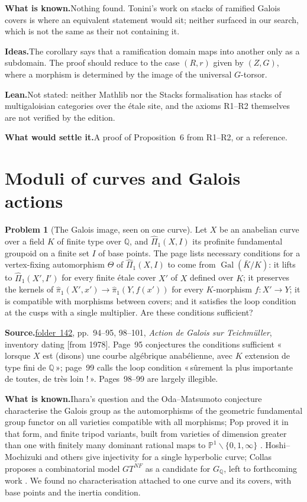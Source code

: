 \documentclass[11pt]{article}
\newcommand{\q}[1]{«\,#1\,»}
\newcommand{\fac}[1]{\href{https://grothendieck.umontpellier.fr/#1.pdf}{folder~#1}}
\newcommand{\Gal}{\operatorname{Gal}}
\theoremstyle{definition}
\newtheorem{problem}{Problem}
\theoremstyle{plain}\newtheorem*{proposition}{Proposition}\theoremstyle{definition}
\newcommand{\entry}[1]{\par\medskip\noindent\textbf{#1}\enspace}
\newcommand{\src}[1]{\entry{Source.}#1}
\newcommand{\known}{\entry{What is known.}}
\newcommand{\ideas}{\entry{Ideas.}}
\newcommand{\leanst}{\entry{Lean.}}
\newcommand{\settle}{\entry{What would settle it.}}
\begin{document}
\known Nothing found. Tonini's work on stacks of ramified Galois covers \cite{tonini2013,tonini2017} is where an equivalent statement would sit; neither surfaced in our search, which is not the same as their not containing it.

\ideas The corollary says that a ramification domain maps into another only as a subdomain. The proof should reduce to the case $(R, r)$ given by $(Z, G)$, where a morphism is determined by the image of the universal $G$-torsor.

\leanst Not stated: neither Mathlib nor the Stacks formalisation \cite{axiomstacks} has stacks of multigaloisian categories over the étale site, and the axioms R1--R2 themselves are not verified by the edition.

\settle A proof of Proposition~6 from R1--R2, or a reference.

\section{Moduli of curves and Galois actions}

\begin{problem}[The Galois image, seen on one curve]\label{p:gal}
Let $X$ be an anabelian curve over a field $K$ of finite type over $\mathbb Q$, and $\hat\Pi_1(X, I)$ its profinite fundamental groupoid on a finite set $I$ of base points. The page lists necessary conditions for a vertex-fixing automorphism $\Theta$ of $\hat\Pi_1(X, I)$ to come from $\Gal(\bar K/K)$: it lifts to $\hat\Pi_1(X', I')$ for every finite étale cover $X'$ of $X$ defined over $K$; it preserves the kernels of $\hat\pi_1(X', x') \to \hat\pi_1(Y, f(x'))$ for every $K$-morphism $f : X' \to Y$; it is compatible with morphisms between covers; and it satisfies the loop condition at the cusps with a single multiplier. Are these conditions sufficient?
\end{problem}

\src{\fac{142}, pp.~94--95, 98--101, \emph{Action de Galois sur Teichmüller}, inventory dating [from 1978]. Page~95 conjectures the conditions sufficient \q{lorsque $X$ est (disons) une courbe algébrique anabélienne, avec $K$ extension de type fini de $\mathbb Q$}; page~99 calls the loop condition \q{sûrement la plus importante de toutes, de très loin !}. Pages~98--99 are largely illegible.}

\known Ihara's question and the Oda--Matsumoto conjecture characterise the Galois group as the automorphisms of the geometric fundamental group functor on all varieties compatible with all morphisms; Pop proved it in that form, and finite tripod variants, built from varieties of dimension greater than one with finitely many dominant rational maps to $\mathbb P^1 \smallsetminus \{0,1,\infty\}$ \cite[Def.~2.2, Th.~2.9]{pop2019}. Hoshi--Mochizuki and others give injectivity for a single hyperbolic curve; Collas proposes a combinatorial model $GT^{NF}$ as a candidate for $G_{\mathbb Q}$, left to forthcoming work \cite[\S4.3.3]{collas}. We found no characterisation attached to one curve and its covers, with base points and the inertia condition.
\end{document}
